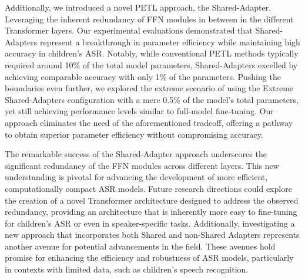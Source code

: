 Additionally, we introduced a novel \ac{PETL} approach, the Shared-Adapter. Leveraging the inherent redundancy of \ac{FFN} modules in between in the different Transformer layers. Our experimental evaluations demonstrated that Shared-Adapters represent a breakthrough in parameter efficiency while maintaining high accuracy in children's \ac{ASR}. Notably, while conventional \ac{PETL} methods typically required around 10\% of the total model parameters, Shared-Adapters excelled by achieving comparable accuracy with only 1\% of the parameters. Pushing the boundaries even further, we explored the extreme scenario of using the Extreme Shared-Adapters configuration with a mere 0.5\% of the model's total parameters, yet still achieving performance levels similar to full-model fine-tuning. Our approach eliminates the need of the aforementioned tradeoff, offering a pathway to obtain superior parameter efficiency without compromising accuracy.

The remarkable success of the Shared-Adapter approach underscores the significant redundancy of the \ac{FFN} modules across different layers. This new understanding is pivotal for advancing the development of more efficient, computationally compact \ac{ASR} models. Future research directions could explore the creation of a novel Transformer architecture designed to address the observed redundancy, providing an architecture that is inherently more easy to fine-tuning for children's \ac{ASR} or even in speaker-specific tasks. Additionally, investigating a new approach that incorporates both Shared and non-Shared Adapters represents another avenue for potential advancements in the field. These avenues hold promise for enhancing the efficiency and robustness of \ac{ASR} models, particularly in contexts with limited data, such as children's speech recognition.